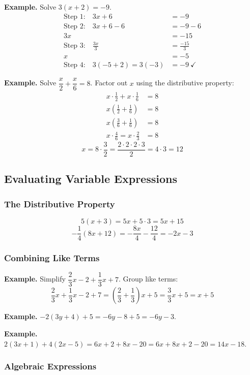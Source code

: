 \documentclass[letter]{article}
\begin{document}
\textbf{Example.} Solve $3(x+2)=-9$.
\begin{align*}
  \text{Step 1:}\quad 3x+6&=-9\\
  \text{Step 2:}\quad 3x+6-6&=-9-6\\
  3x&=-15\\
  \text{Step 3:}\quad\frac{3x}3&=\frac{-15}3\\
  x&=-5\\
  \text{Step 4:}\quad 3(-5+2)=3(-3)&=-9\ \checkmark
\end{align*}

\textbf{Example.} Solve $\dfrac x2+\dfrac x6=8$. Factor out $x$ using the distributive property:
\begin{align*}
  x\cdot\frac12+x\cdot\frac16&=8\\
  x\left(\frac12+\frac16\right)&=8\\
  x\left(\frac36+\frac16\right)&=8\\
  x\cdot\frac46=x\cdot\frac23&=8
\end{align*}
\[x=8\cdot\frac32=\frac{2\cdot2\cdot2\cdot3}{2}=4\cdot3=12\]

\subsection{Evaluating Variable Expressions}

\subsubsection*{The Distributive Property}

\[5(x+3)=5x+5\cdot3=5x+15\]
\[-\frac14(8x+12)=-\frac{8x}4-\frac{12}4=-2x-3\]

\subsubsection*{Combining Like Terms}

\textbf{Example.} Simplify $\dfrac23x-2+\dfrac13x+7$. Group like terms:
\[\frac23x+\frac13x-2+7=\left(\frac23+\frac13\right)x+5=\frac33x+5=x+5\]

\textbf{Example.} $-2(3y+4)+5=-6y-8+5=-6y-3$.

\textbf{Example.} $2(3x+1)+4(2x-5)=6x+2+8x-20=6x+8x+2-20=14x-18$.

\subsubsection*{Algebraic Expressions}
\end{document}
